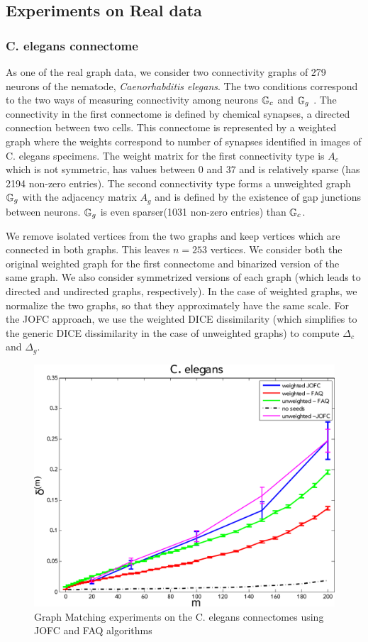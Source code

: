 \documentclass[12pt,oneside,final]{thesis}\usepackage[]{graphicx}\usepackage[]{color}
\begin{document}
\subsection{Experiments on Real data}

\subsubsection{C. elegans connectome}
As one of the real graph data, we consider two connectivity graphs of 279 neurons of the  nematode, \textit{Caenorhabditis elegans}. The two conditions correspond to the two ways of measuring connectivity among neurons $\mathbb{G}_c$ and $\mathbb{G}_g$ . The connectivity in the first connectome is defined by chemical synapses, a directed connection between two cells. This connectome is represented by a weighted graph where the weights correspond to number of synapses identified in images of C. elegans specimens.  The  weight matrix for the first connectivity type is $A_c$ which is not symmetric, has values between 0 and 37 and is relatively sparse (has 2194 non-zero entries). The second connectivity type forms a unweighted graph $\mathbb{G}_g$ with the adjacency matrix $A_g$ and is defined by the existence of gap junctions between neurons. $\mathbb{G}_g$ is even sparser(1031 non-zero entries) than $\mathbb{G}_c$.

We remove isolated vertices from the two graphs and keep vertices which are connected in both graphs. This leaves $n=253$  vertices. We consider both the original weighted graph for the first connectome and binarized version of the same graph. We  also consider symmetrized versions of each graph (which leads to directed and undirected graphs, respectively). In the case of weighted graphs, we normalize the two graphs, so that they approximately have the same scale. For the JOFC approach, we use the weighted DICE dissimilarity (which simplifies to the generic DICE dissimilarity in the case of unweighted graphs) to compute $\Delta_c$ and $\Delta_g$.   

\begin{figure}
\includegraphics[scale=0.75]{worm_jofc_vs_faq_wt_unwt-crop}
\caption{Graph Matching experiments on the C. elegans connectomes using JOFC and FAQ algorithms \label{worm_graphmatch}}
\end{figure}
\end{document}
